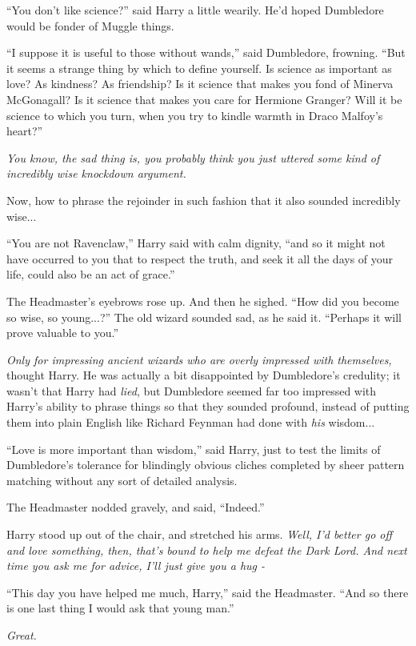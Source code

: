 ``You don't like science?'' said Harry a little wearily. He'd hoped
Dumbledore would be fonder of Muggle things.

``I suppose it is useful to those without wands,'' said Dumbledore,
frowning. ``But it seems a strange thing by which to define yourself. Is
science as important as love? As kindness? As friendship? Is it science
that makes you fond of Minerva McGonagall? Is it science that makes you
care for Hermione Granger? Will it be science to which you turn, when
you try to kindle warmth in Draco Malfoy's heart?''

\emph{You know, the sad thing is, you probably think you just uttered
some kind of incredibly wise knockdown argument.}

Now, how to phrase the rejoinder in such fashion that it also sounded
incredibly wise...

``You are not Ravenclaw,'' Harry said with calm dignity, ``and so it
might not have occurred to you that to respect the truth, and seek it
all the days of your life, could also be an act of grace.''

The Headmaster's eyebrows rose up. And then he sighed. ``How did you
become so wise, so young...?'' The old wizard sounded sad, as he
said it. ``Perhaps it will prove valuable to you.''

\emph{Only for impressing ancient wizards who are overly impressed with
themselves,} thought Harry. He was actually a bit disappointed by
Dumbledore's credulity; it wasn't that Harry had \emph{lied}, but
Dumbledore seemed far too impressed with Harry's ability to phrase
things so that they sounded profound, instead of putting them into plain
English like Richard Feynman had done with \emph{his} wisdom...

``Love is more important than wisdom,'' said Harry, just to test the
limits of Dumbledore's tolerance for blindingly obvious cliches
completed by sheer pattern matching without any sort of detailed
analysis.

The Headmaster nodded gravely, and said, ``Indeed.''

Harry stood up out of the chair, and stretched his arms. \emph{Well, I'd
better go off and love something, then, that's bound to help me defeat
the Dark Lord. And next time you ask me for advice, I'll just give you a
hug -}

``This day you have helped me much, Harry,'' said the Headmaster. ``And
so there is one last thing I would ask that young man.''

\emph{Great.}

